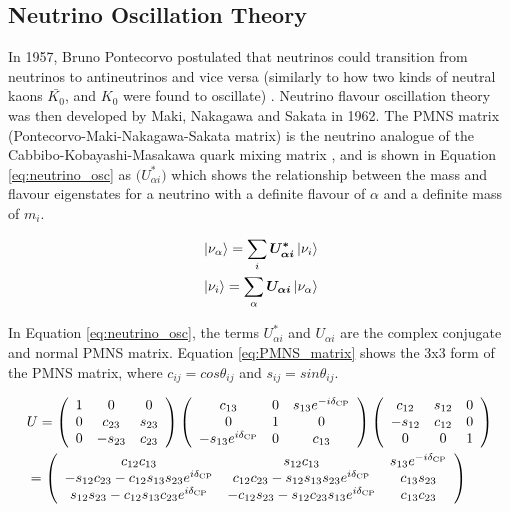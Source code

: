 \subsection{Neutrino Oscillation Theory}
In 1957, Bruno Pontecorvo postulated that neutrinos could transition from neutrinos to antineutrinos and vice versa (similarly to how two kinds of neutral kaons $\bar{K_{0}}$, and $K_{0}$ were found to oscillate) \cite{Pontecorvo:1957cp}. Neutrino flavour oscillation theory was then developed by Maki, Nakagawa and Sakata in 1962. The PMNS matrix (Pontecorvo-Maki-Nakagawa-Sakata matrix) is the neutrino analogue of the Cabbibo-Kobayashi-Masakawa quark mixing matrix \cite{maki_pmns}, and is shown in Equation \ref{eq:neutrino_osc} as $\boldsymbol(U_{\alpha i}^{*})$ which shows the relationship between the mass and flavour eigenstates for a neutrino with a definite flavour of $\alpha$ and a definite mass of $m_{i}$.


\begin{align}
&\left|\nu_{\alpha}\right\rangle=\sum_{i} \boldsymbol{U_{\alpha i}^{*}}\left|\nu_{i}\right\rangle \label{eq:neutrino_osc}  \\
&\left|\nu_{i}\right\rangle=\sum_{\alpha} \boldsymbol{U_{\alpha i}}\left|\nu_{\alpha}\right\rangle \notag
\end{align}


In Equation \ref{eq:neutrino_osc}, the terms $U_{\alpha i}^{*}$ and $U_{\alpha i}$ are the complex conjugate and normal PMNS matrix. Equation \ref{eq:PMNS_matrix} shows the 3x3 form of the PMNS matrix, where $c_{ij} = cos {\theta_{ij}}$ and $s_{ij} = sin {\theta_{ij}}$.

\begin{align}
&U=\left(\begin{array}{ccc} \label{eq:PMNS_matrix}
1 & 0 & 0 \\
0 & c_{23} & s_{23} \\
0 & -s_{23} & c_{23}
\end{array}\right)\left(\begin{array}{ccc}
c_{13} & 0 & s_{13} e^{-i \delta_{\mathrm{CP}}} \\
0 & 1 & 0 \\
-s_{13} e^{i \delta_{\mathrm{CP}}} & 0 & c_{13}
\end{array}\right)\left(\begin{array}{ccc}
c_{12} & s_{12} & 0 \\
-s_{12} & c_{12} & 0 \\
0 & 0 & 1
\end{array}\right)\\
&=\left(\begin{array}{ccc} \notag
c_{12} c_{13} & s_{12} c_{13} & s_{13} e^{-i \delta_{\mathrm{CP}}} \\
-s_{12} c_{23}-c_{12} s_{13} s_{23} e^{i \delta_{\mathrm{CP}}} & c_{12} c_{23}-s_{12} s_{13} s_{23} e^{i \delta_{\mathrm{CP}}} & c_{13} s_{23} \\
s_{12} s_{23}-c_{12} s_{13} c_{23} e^{i \delta_{\mathrm{CP}}} & -c_{12} s_{23}-s_{12} c_{23} s_{13} e^{i \delta_{\mathrm{CP}}} & c_{13} c_{23}
\end{array}\right)
\end{align}



